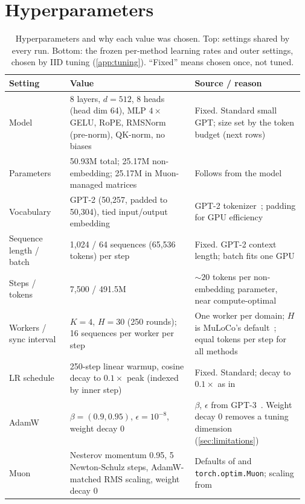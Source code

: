 \documentclass{article}
\begin{document}
\section{Hyperparameters}\label{app:hparams}
\begin{table}[!htbp]
  \centering
  \footnotesize
  \caption{Hyperparameters and why each value was chosen. Top: settings shared by every run. Bottom: the frozen per-method learning rates and outer settings, chosen by IID tuning (\cref{app:tuning}). ``Fixed'' means chosen once, not tuned.}
  \label{tab:hparams}
  \setlength{\tabcolsep}{4pt}
  \begin{tabular}{@{}p{0.2\linewidth}p{0.41\linewidth}p{0.36\linewidth}@{}}
    \toprule
    Setting & Value & Source / reason \\
    \midrule
    Model & 8 layers, $d=512$, 8 heads (head dim 64), MLP $4\times$ GELU, RoPE, RMSNorm (pre-norm), QK-norm, no biases & Fixed. Standard small GPT; size set by the token budget (next rows) \\
    Parameters & 50.93M total; 25.17M non-embedding; 25.17M in Muon-managed matrices & Follows from the model \\
    Vocabulary & GPT-2 (50{,}257, padded to 50{,}304), tied input/output embedding & GPT-2 tokenizer~\cite{radford2019gpt2}; padding for GPU efficiency \\
    Sequence length / batch & 1{,}024 / 64 sequences (65{,}536 tokens) per step & Fixed. GPT-2 context length; batch fits one GPU \\
    Steps / tokens & 7{,}500 / 491.5M & $\sim20$ tokens per non-embedding parameter, near compute-optimal~\cite{hoffmann2022chinchilla} \\
    Workers / sync interval & $K=4$, $H=30$ (250 rounds); 16 sequences per worker per step & One worker per domain; $H$ is MuLoCo's default~\cite{therien2025muloco}; equal tokens per step for all methods \\
    LR schedule & 250-step linear warmup, cosine decay to $0.1\times$ peak (indexed by inner step) & Fixed. Standard; decay to $0.1\times$ as in~\cite{hoffmann2022chinchilla} \\
    AdamW & $\beta=(0.9, 0.95)$, $\epsilon=10^{-8}$, weight decay 0 & $\beta$, $\epsilon$ from GPT-3~\cite{brown2020gpt3}. Weight decay 0 removes a tuning dimension (\cref{sec:limitations}) \\
    Muon & Nesterov momentum 0.95, 5 Newton-Schulz steps, AdamW-matched RMS scaling, weight decay 0 & Defaults of \citet{jordan2024muon} and \texttt{torch.optim.Muon}; scaling from \citet{liu2025muonscalable} \\

\end{tabular}
\end{table}
\end{document}
